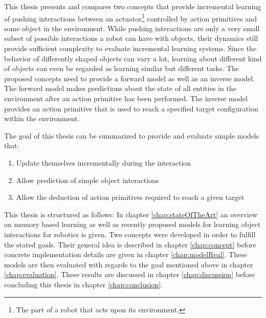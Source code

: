 This thesis presents and compares two concepts that provide incremental learning of pushing interactions between an actuator\footnote{The part of a robot that acts upon its environment.} controlled by action primitives and some object in the environment.
While pushing interactions are only a very small subset of possible interactions a robot can have with objects, their dynamics still provide sufficient complexity to evaluate incremental learning systems. Since the behavior of differently shaped objects can vary a lot, learning about different kind of objects can even be regarded as learning similar but different tasks.%
The proposed concepts need to provide a forward model as well as an inverse model. The forward model makes predictions about the state of all entities in the environment after an action primitive has been performed. The inverse model provides an action primitive that is used to reach a specified target configuration within the environment.

The goal of this thesis can be summarized to provide and evaluate simple models that:

\begin{enumerate}
	\item Update themselves incrementally during the interaction
	\item Allow prediction of simple object interactions %
	\item Allow the deduction of action primitives required to reach a given target 
\end{enumerate}

This thesis is structured as follows: In chapter \ref{chap:stateOfTheArt} an overview on memory based learning as well as recently proposed models for learning object interactions for robotics is given. Two concepts were developed in order to fulfill the stated goals. Their general idea is described in chapter \ref{chap:concept} before concrete implementation details are given in chapter \ref{chap:modelReal}. These models are then evaluated with regards to the goal mentioned above in chapter \ref{chap:evaluation}. These results are discussed in chapter \ref{chap:discussion} before concluding this thesis in chapter \ref{chap:conclusion}.

